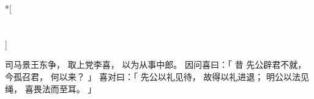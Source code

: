 
\switchcolumn[0]*[\section{}]

司马景王东争，
取上党李喜，
以为从事中郎。
因问喜曰：「
    昔
    先公辟君不就，
    今孤召君，
    何以来？
」
喜对曰：「
    先公以礼见待，
    故得以礼进退；
    明公以法见绳，
    喜畏法而至耳。
」

\switchcolumn




